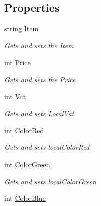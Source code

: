 \subsection*{Properties}
\begin{DoxyCompactItemize}
\item 
string \mbox{\hyperlink{class_p_o_s__system_1_1product_a430d3d9ce4743bef12782920b9481bd9}{Item}}
\begin{DoxyCompactList}\small\item\em Gets and sets the Item \end{DoxyCompactList}\item 
int \mbox{\hyperlink{class_p_o_s__system_1_1product_a482b32a8e533e2ab3a8cfbcea2a4c870}{Price}}
\begin{DoxyCompactList}\small\item\em Gets and sets the Price \end{DoxyCompactList}\item 
int \mbox{\hyperlink{class_p_o_s__system_1_1product_aeaae4adfbfee9dc8b074bd2621e46028}{Vat}}
\begin{DoxyCompactList}\small\item\em Gets and sets Local\+Vat \end{DoxyCompactList}\item 
int \mbox{\hyperlink{class_p_o_s__system_1_1product_a2b92f033b68e953b5d5696f85e6c0e52}{Color\+Red}}
\begin{DoxyCompactList}\small\item\em Gets and sets local\+Color\+Red \end{DoxyCompactList}\item 
int \mbox{\hyperlink{class_p_o_s__system_1_1product_a6c2803f7cbf74696ecb31293e18a4aff}{Color\+Green}}
\begin{DoxyCompactList}\small\item\em Gets and sets local\+Color\+Green \end{DoxyCompactList}\item 
int \mbox{\hyperlink{class_p_o_s__system_1_1product_a531a2984add8917c4520aaedd0b3c2fc}{Color\+Blue}}

\end{DoxyCompactItemize}

